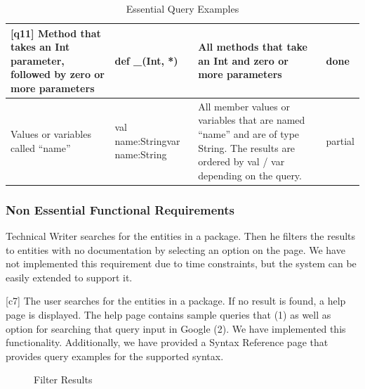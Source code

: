 \begin{table}[htbp]
\begin{center}
\begin{tabular}{|p{1.4in}|p{0.7in}|p{1.8in}|p{0.4in}|}
[q11] Method that takes an Int parameter, followed by zero or more parameters & def \_(Int, *) & All methods that take an Int and zero or more parameters & done \\ \hline 
[q12]  Values or variables called ``name'' & val name:String\newline var name:String & All member values or variables that are named ``name'' and are of type String. The results are ordered by val / var depending on the query. & partial \\ \hline 
\end{tabular}
\caption{Essential Query Examples}
\label{essential_query_examples}
\end{center}
\end{table}

\subsubsection{Non Essential Functional Requirements} 
\indent \indent [c6] Technical Writer searches for the entities in a package. Then he filters the results to entities with no documentation by selecting an option on the page. We have not implemented this requirement due to time constraints, but the system can be easily extended to support it.

[c7] The user searches for the entities in a package. If no result is found, a help page is displayed. The help page contains sample queries that (1) as well as option for searching that query input in Google (2).
We have implemented this functionality. Additionally, we have provided a Syntax Reference page that provides query examples for the supported syntax.

\begin{figure}[h!t]
\begin{center}
\leavevmode
{}
\end{center}
\caption{Filter Results}
\label{fig:filter_results}
\end{figure}

